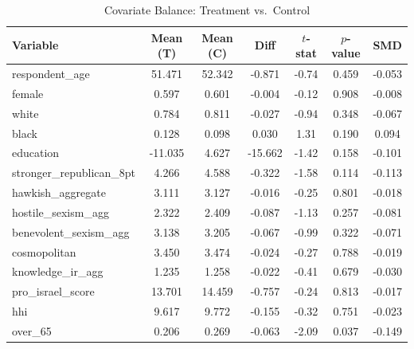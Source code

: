 \begin{table}[htbp]
\centering
\caption{Covariate Balance: Treatment vs.\ Control}
\label{tab:balance}
\begin{tabular}{lcccccc}
\hline\hline
Variable & Mean (T) & Mean (C) & Diff & $t$-stat & $p$-value & SMD \\
\hline
respondent\_age & 51.471 & 52.342 & -0.871 & -0.74 & 0.459 & -0.053 \\
female & 0.597 & 0.601 & -0.004 & -0.12 & 0.908 & -0.008 \\
white & 0.784 & 0.811 & -0.027 & -0.94 & 0.348 & -0.067 \\
black & 0.128 & 0.098 & 0.030 & 1.31 & 0.190 & 0.094 \\
education & -11.035 & 4.627 & -15.662 & -1.42 & 0.158 & -0.101 \\
stronger\_republican\_8pt & 4.266 & 4.588 & -0.322 & -1.58 & 0.114 & -0.113 \\
hawkish\_aggregate & 3.111 & 3.127 & -0.016 & -0.25 & 0.801 & -0.018 \\
hostile\_sexism\_agg & 2.322 & 2.409 & -0.087 & -1.13 & 0.257 & -0.081 \\
benevolent\_sexism\_agg & 3.138 & 3.205 & -0.067 & -0.99 & 0.322 & -0.071 \\
cosmopolitan & 3.450 & 3.474 & -0.024 & -0.27 & 0.788 & -0.019 \\
knowledge\_ir\_agg & 1.235 & 1.258 & -0.022 & -0.41 & 0.679 & -0.030 \\
pro\_israel\_score & 13.701 & 14.459 & -0.757 & -0.24 & 0.813 & -0.017 \\
hhi & 9.617 & 9.772 & -0.155 & -0.32 & 0.751 & -0.023 \\
over\_65 & 0.206 & 0.269 & -0.063 & -2.09 & 0.037 & -0.149 \\
\hline\hline
\end{tabular}
\end{table}
